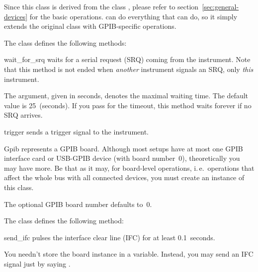 \documentclass{howto}
\begin{document}
\begin{notice}
  Since this class is derived from the class , please refer
  to section~\ref{sec:general-devices} for the basic operations.
   can do everything that  can do, so
  it simply extends the original class with GPIB-specific operations.
\end{notice}

The class  defines the following methods:

\begin{methoddesc}{wait_for_srq}{}
  waits for a serial request (SRQ) coming from the instrument.  Note that this
  method is not ended when \emph{another} instrument signals an SRQ, only
  \emph{this} instrument.
  
  The  argument, given in seconds, denotes the maximal waiting
  time.  The default value is 25~(seconds).  If you pass  for the
  timeout, this method waits forever if no SRQ arrives.
\end{methoddesc}

\begin{methoddesc}{trigger}{}
  sends a trigger signal to the instrument.
\end{methoddesc}

\bigskip
\begin{classdesc}{Gpib}{}
  represents a GPIB board.  Although most setups have at most one GPIB
  interface card or USB-GPIB device (with board number~0), theoretically you
  may have more.  Be that as it may, for board-level operations, i.\,e.\
  operations that affect the whole bus with all connected devices, you must
  create an instance of this class.

  The optional GPIB board number  defaults to~0.
\end{classdesc}

The class  defines the following method:

\begin{methoddesc}{send_ifc}{}
  pulses the interface clear line (IFC) for at least 0.1~seconds.
\end{methoddesc}

\begin{notice}
You needn't store the board instance in a variable.  Instead, you may send an
IFC signal just by saying \samp{Gpib().send_ifc()}.
\end{notice}
\end{document}
